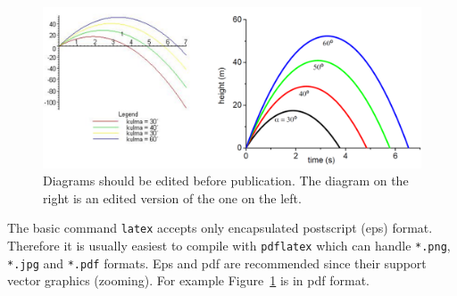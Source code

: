 \documentclass[12pt,a4paper,finnish]{tutthesis}
\begin{document}
\begin{figure}[t]
  \begin{center}
    \includegraphics[width=1.0\textwidth]{exampleFig}
  \end{center}
  \caption[Diagrams should be edited before publication.]{Diagrams
    should be edited before publication. The diagram on the right is
    an edited version of the one on the left.}
  \label{fig:ex_fig}
\end{figure}




The basic command \texttt{latex} accepts only encapsulated postscript
(eps) format. Therefore it is usually easiest to compile with
\texttt{pdflatex} which can handle \verb+*.png+, \verb+*.jpg+ and
\verb+*.pdf+ formats. Eps and pdf are recommended since their support
vector graphics (zooming). For example Figure~\ref{fig:ex_fig} is in
pdf format. 
\end{document}
